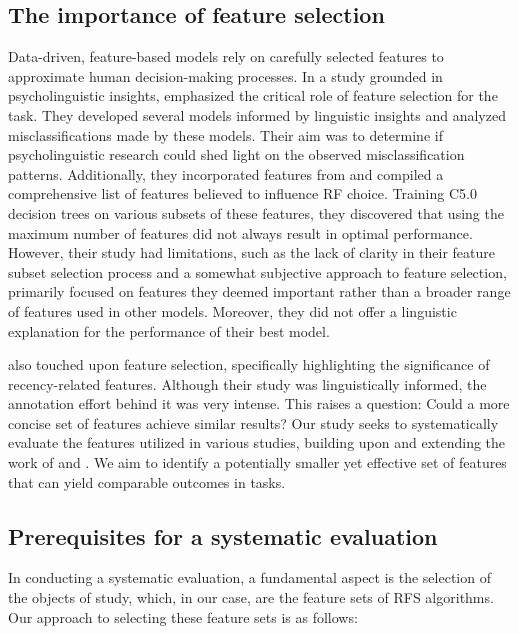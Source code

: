 \subsection{The importance of feature selection}\label{sec:rol}

Data-driven, feature-based models rely on carefully selected features to approximate human decision-making processes. In a study grounded in psycholinguistic insights, \citet{greenbacker2009feature} emphasized the critical role of feature selection for the \context task. They developed several models informed by linguistic insights and analyzed misclassifications made by these models. Their aim was to determine if psycholinguistic research could shed light on the observed misclassification patterns. Additionally, they incorporated features from \citet{hendrickx2008cnts} and compiled a comprehensive list of features believed to influence RF choice. Training C5.0 decision trees on various subsets of these features, they discovered that using the maximum number of features did not always result in optimal performance. However, their study had limitations, such as the lack of clarity in their feature subset selection process and a somewhat subjective approach to feature selection, primarily focused on features they deemed important rather than a broader range of features used in other models. Moreover, they did not offer a linguistic explanation for the performance of their best model.

\citet{kibrik2016referential} also touched upon feature selection, specifically highlighting the significance of recency-related features. Although their study was linguistically informed, the annotation effort behind it was very intense. This raises a question: Could a more concise set of features achieve similar results? Our study seeks to systematically evaluate the features utilized in various \context studies, building upon and extending the work of \citet{greenbacker2009feature} and \citet{kibrik2016referential}. We aim to identify a potentially smaller yet effective set of features that can yield comparable outcomes in \context tasks.

\subsection{Prerequisites for a systematic evaluation}\label{sec:prereq}
In conducting a systematic evaluation, a fundamental aspect is the selection of the objects of study, which, in our case, are the feature sets of RFS algorithms. Our approach to selecting these feature sets is as follows:

